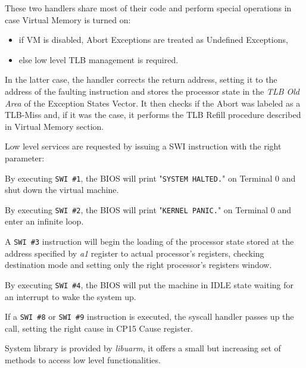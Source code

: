 
These two handlers share most of their code and perform special operations in case Virtual Memory is turned on:
\begin{itemize}
	\item if VM is disabled, Abort Exceptions are treated as Undefined Exceptions,
	\item else low level TLB management is required.
\end{itemize}

In the latter case, the handler corrects the return address, setting it to the address of the faulting instruction and stores the processor state in the \emph{TLB Old Area} of the Exception States Vector.
It then checks if the Abort was labeled as a TLB-Miss and, if it was the case, it performs the TLB Refill procedure described in Virtual Memory section.


Low level services are requested by issuing a SWI instruction with the right parameter:


By executing \texttt{SWI \#1}, the BIOS will print "\texttt{SYSTEM HALTED.}" on Terminal 0 and shut down the virtual machine.


By executing \texttt{SWI \#2}, the BIOS will print "\texttt{KERNEL PANIC.}" on Terminal 0 and enter an infinite loop.


A \texttt{SWI \#3} instruction will begin the loading of the processor state stored at the address specified by \emph{a1} register to actual processor's registers, checking destination mode and setting only the right processor's registers window.


By executing \texttt{SWI \#4}, the BIOS will put the machine in IDLE state waiting for an interrupt to wake the system up.


If a \texttt{SWI \#8} or \texttt{SWI \#9} instruction is executed, the syscall handler passes up the call, setting the right cause in CP15 Cause register.

\label{sec:man:systemLibrary}

System library is provided by \emph{libuarm}, it offers a small but increasing set of methods to access low level functionalities.

